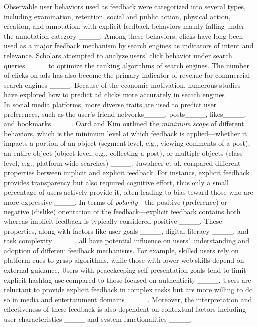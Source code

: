 Observable user behaviors used as feedback were categorized into several types, including examination, retention, social and public action, physical action, creation, and annotation, with explicit feedback behaviors mainly falling under the annotation category ____. Among these behaviors, clicks have long been used as a major feedback mechanism by search engines as indicators of intent and relevance. Scholars attempted to analyze users' click behavior under search queries____ to optimize the ranking algorithms of search engines. The number of clicks on ads has also become the primary indicator of revenue for commercial search engines ____. Because of the economic motivation, numerous studies have explored how to predict ad clicks more accurately in search engines ____. In social media platforms, more diverse traits are used to predict user preferences, such as the user's friend networks____, posts____, likes____, and bookmarks____. Oard and Kim outlined the \textit{minimum scope} of different behaviors, which is the minimum level at which feedback is applied---whether it impacts a portion of an object (segment level, e.g., viewing comments of a post), an entire object (object level, e.g., collecting a post), or multiple objects (class level, e.g., platform-wide searches) ____. Jawaheer et al. compared different properties between implicit and explicit feedback. For instance, explicit feedback provides transparency but also required cognitive effort, thus only a small percentage of users actively provide it, often leading to bias toward those who are more expressive ____. In terms of \textit{polarity}---the positive (preference) or negative (dislike) orientation of the feedback---explicit feedback contains both whereas implicit feedback is typically considered positive ____. These properties, along with factors like user goals ____, digital literacy ____, and task complexity ____, all have potential influence on users' understanding and adoption of different feedback mechanisms. For example, skilled users rely on platform cues to grasp algorithms, while those with lower web skills depend on external guidance. Users with peacekeeping self-presentation goals tend to limit explicit hashtag use compared to those focused on authenticity ____. Users are reluctant to provide explicit feedback in complex tasks but are more willing to do so in media and entertainment domains ____. Moreover, the interpretation and effectiveness of these feedback is also dependent on contextual factors including user characteristics ____ and system functionalities ____.

